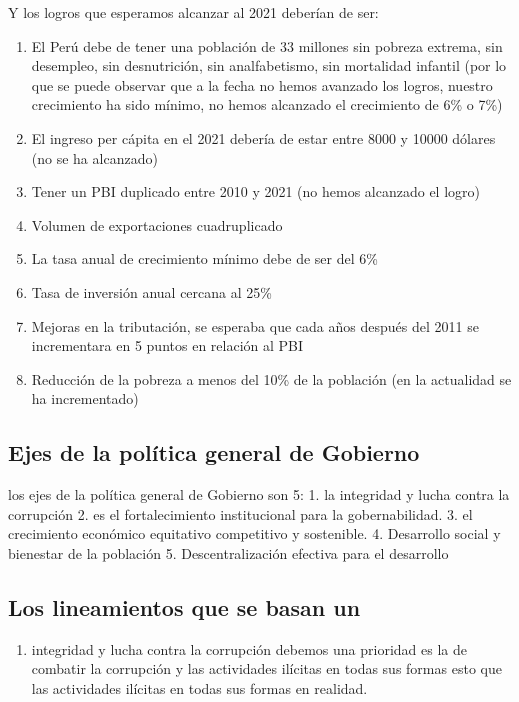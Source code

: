 \documentclass[
  letterpaper,
  DIV=11,
  numbers=noendperiod]{scrartcl}
\providecommand{\tightlist}{%
  \setlength{\itemsep}{0pt}\setlength{\parskip}{0pt}}\usepackage{longtable,booktabs,array}
\begin{document}
Y los logros que esperamos alcanzar al 2021 deberían de ser:

\begin{enumerate}
\def\labelenumi{\arabic{enumi}.}
\tightlist
\item
  El Perú debe de tener una población de 33 millones sin pobreza
  extrema, sin desempleo, sin desnutrición, sin analfabetismo, sin
  mortalidad infantil (por lo que se puede observar que a la fecha no
  hemos avanzado los logros, nuestro crecimiento ha sido mínimo, no
  hemos alcanzado el crecimiento de 6\% o 7\%)
\item
  El ingreso per cápita en el 2021 debería de estar entre 8000 y 10000
  dólares (no se ha alcanzado)
\item
  Tener un PBI duplicado entre 2010 y 2021 (no hemos alcanzado el logro)
\item
  Volumen de exportaciones cuadruplicado
\item
  La tasa anual de crecimiento mínimo debe de ser del 6\%
\item
  Tasa de inversión anual cercana al 25\%
\item
  Mejoras en la tributación, se esperaba que cada años después del 2011
  se incrementara en 5 puntos en relación al PBI
\item
  Reducción de la pobreza a menos del 10\% de la población (en la
  actualidad se ha incrementado)
\end{enumerate}

\hypertarget{ejes-de-la-poluxedtica-general-de-gobierno}{%
\subsection{Ejes de la política general de
Gobierno}\label{ejes-de-la-poluxedtica-general-de-gobierno}}

los ejes de la política general de Gobierno son 5: 1. la integridad y
lucha contra la corrupción 2. es el fortalecimiento institucional para
la gobernabilidad. 3. el crecimiento económico equitativo competitivo y
sostenible. 4. Desarrollo social y bienestar de la población 5.
Descentralización efectiva para el desarrollo

\hypertarget{los-lineamientos-que-se-basan-un}{%
\subsection{Los lineamientos que se basan
un}\label{los-lineamientos-que-se-basan-un}}

\begin{enumerate}
\def\labelenumi{\arabic{enumi}.}
\tightlist
\item
  integridad y lucha contra la corrupción debemos una prioridad es la de
  combatir la corrupción y las actividades ilícitas en todas sus formas
  esto que las actividades ilícitas en todas sus formas en realidad.
\end{enumerate}
\end{document}
